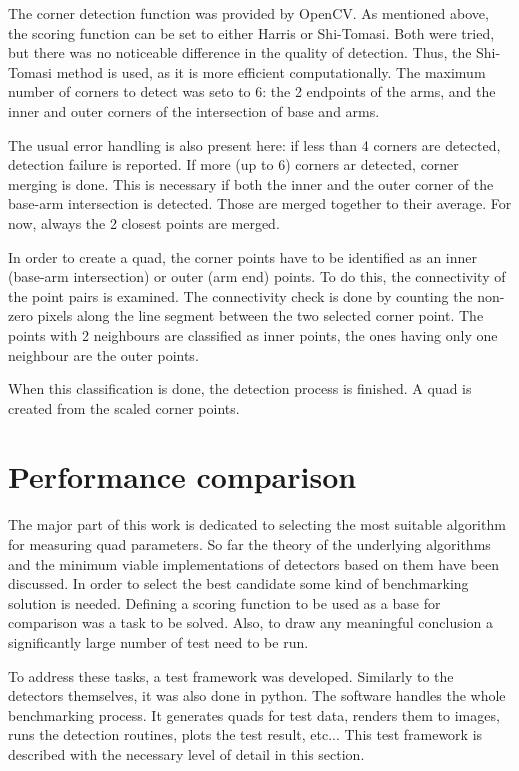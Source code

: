 The corner detection function was provided by OpenCV.
As mentioned above, the scoring function can be set to either Harris or Shi-Tomasi.
Both were tried, but there was no noticeable difference in the quality of detection.
Thus, the Shi-Tomasi method is used, as it is more efficient computationally.
The maximum number of corners to detect was seto to 6: the 2 endpoints of the arms, and the inner and outer corners of the intersection of base and arms.

The usual error handling is also present here: if less than 4 corners are detected, detection failure is reported.
If more (up to 6) corners ar detected, corner merging is done.
This is necessary if both the inner and the outer corner of the base-arm intersection is detected.
Those are merged together to their average.
For now, always the 2 closest points are merged.

In order to create a quad, the corner points have to be identified as an inner (base-arm intersection) or outer (arm end) points.
To do this, the connectivity of the point pairs is examined.
The connectivity check is done by counting the non-zero pixels along the line segment between the two selected corner point.
The points with 2 neighbours are classified as inner points, the ones having only one neighbour are the outer points.

When this classification is done, the detection process is finished.
A quad is created from the scaled corner points.

\section{Performance comparison}

The major part of this work is dedicated to selecting the most suitable algorithm for measuring quad parameters.
So far the theory of the underlying algorithms and the minimum viable implementations of detectors based on them have been discussed.
In order to select the best candidate some kind of benchmarking solution is needed.
Defining a scoring function to be used as a base for comparison was a task to be solved.
Also, to draw any meaningful conclusion a significantly large number of test need to be run.

To address these tasks, a test framework was developed.
Similarly to the detectors themselves, it was also done in python.
The software handles the whole benchmarking process.
It generates quads for test data, renders them to images, runs the detection routines, plots the test result, etc...
This test framework is described with the necessary level of detail in this section.

